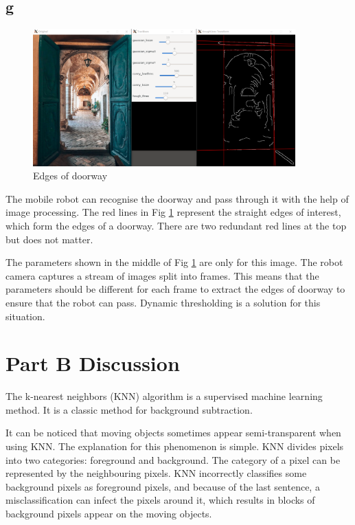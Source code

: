 \subsection{g}
\begin{figure}[htbp]
   \centering
   \includegraphics[width=0.9\textwidth]{assets/images/figures/edges_of_doorway.png}
   \caption{Edges of doorway}
   \label{fig:edges_of_doorway}
\end{figure}

The mobile robot can recognise the doorway and pass through it with the help of image processing. The red lines in Fig \ref{fig:edges_of_doorway} represent the straight edges of interest, which form the edges of a doorway. There are two redundant red lines at the top but does not matter.

The parameters shown in the middle of Fig \ref{fig:edges_of_doorway} are only for this image. The robot camera captures a stream of images split into frames. This means that the parameters should be different for each frame to extract the edges of doorway to ensure that the robot can pass. Dynamic thresholding is a solution for this situation.

\section{Part B Discussion}
The k-nearest neighbors (KNN) algorithm is a supervised machine learning method. It is a classic method for background subtraction.

It can be noticed that moving objects sometimes appear semi-transparent when using KNN. The explanation for this phenomenon is simple. KNN divides pixels into two categories: foreground and background. The category of a pixel can be represented by the neighbouring pixels. KNN incorrectly classifies some background pixels as foreground pixels, and because of the last sentence, a misclassification can infect the pixels around it, which results in blocks of background pixels appear on the moving objects.

